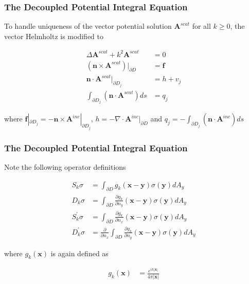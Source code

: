 \documentclass{beamer}
\newcommand{\bvec}[1]{\boldsymbol{#1}}
\begin{document}
	\begin{frame}
	\frametitle{The Decoupled Potential Integral Equation}
	To handle uniqueness of the vector potential solution $\bvec{A}^{scat}$ for all $k \geq 0$, the vector Helmholtz is modified to
	
	\begin{align*}
	\Delta \bvec{A}^{scat} + k^2 \bvec{A}^{scat} &= 0 \\
	\left(\bvec{n} \times \bvec{A}^{scat}\right)|_{\partial D} &= \bvec{f} \\
	\bvec{n} \cdot \bvec{A}^{scat}|_{\partial D_j} &= h + v_j \\
	\int_{\partial D_j} \left( \bvec{n} \cdot \bvec{A}^{scat} \right) ds &= q_j
	\end{align*}
	
	where $\bvec{f}|_{\partial D_j} = - \bvec{n} \times \bvec{A}^{inc}|_{\partial D_j}$, $h = - \nabla \cdot \bvec{A}^{inc}|_{\partial D}$ and $q_j = - \int_{\partial D_j} \left( \bvec{n} \cdot \bvec{A}^{inc} \right) ds$
	
	\end{frame}

	\begin{frame}
	\frametitle{The Decoupled Potential Integral Equation}
	Note the following operator definitions
	
	\begin{align*}
	S_k \sigma &= \int_{\partial D} g_k (\bvec{x} - \bvec{y}) \sigma(\bvec{y}) dA_y \\
	D_k \sigma &= \int_{\partial D} \frac{\partial g_k}{\partial n_y} (\bvec{x} - \bvec{y}) \sigma(\bvec{y}) dA_y \\
	S_k^{'} \sigma &= \int_{\partial D} \frac{\partial g_k}{\partial n_x}  (\bvec{x} - \bvec{y}) \sigma(\bvec{y}) dA_y \\
	D_k^{'} \sigma &= \frac{\partial }{\partial n_x}  \int_{\partial D} \frac{\partial g_k}{\partial n_y}  (\bvec{x} - \bvec{y}) \sigma(\bvec{y}) dA_y
	\end{align*}
	
	where $g_k(\bvec{x})$ is again defined as
	
	\begin{align*}
	g_k(\bvec{x}) &= \frac{e^{i k |\bvec{x}|}}{4 \pi |\bvec{x}|}
	\end{align*}
	
\end{frame}
\end{document}
